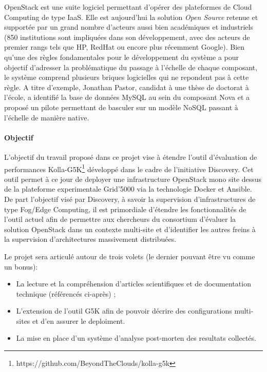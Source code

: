 \documentclass[a4paper,11pt]{article}
\begin{document}
\begin{note}
OpenStack est une suite logiciel permettant d'opérer des plateformes
de Cloud Computing de type IaaS. Elle est aujourd'hui la solution
\emph{Open Source} retenue et supportée par un grand nombre d'acteurs aussi
bien académiques et industriels (850 institutions sont impliquées
dans son développement, avec des acteurs de premier rangs tels que HP,
RedHat ou encore plus récemment Google).  Bien qu'une des règles
fondamentales pour le développement du système a pour objectif
d'adresser la problématique du passage à l'échelle de chaque
composant, le système comprend plusieurs briques logicielles qui ne
repondent pas à cette règle. A titre d'exemple, Jonathan Pastor,
candidat à une thèse de doctorat à l'école, a identifié la base de
données MySQL au sein du composant Nova et a proposé un pilote
permettant de basculer sur un modèle NoSQL passant à l'échelle de
manière native. 



\paragraph*{Objectif\\}
L'objectif du travail proposé dans ce projet vise à étendre l'outil
d'évaluation de performances
Kolla-G5K\footnote{https://github.com/BeyondTheClouds/kolla-g5k}
développé dans le cadre de l'initiative Discovery. Cet outil permet à
ce jour de deployer une infrastructure OpenStack mono site dessus de
la plateforme experimentale Grid'5000 via la technologie Docker et
Ansible.  De part l'objectif visé par Discovery, à savoir la
supervision d'infrastructures de type Fog/Edge Computing, il est
primordiale d'étendre les fonctionnalités de l'outil actuel afin de
permettre aux chercheurs du consortium d'évaluer la solution
OpenStack dans un contexte multi-site et d'identifier les autres
freins à la supervision d'architectures massivement distribuées.

Le projet sera articulé autour de trois volets (le dernier pouvant être vu comme un bonus):
\begin{itemize}
\item La lecture et la compréhension d'articles scientifiques et de documentation technique (référencés ci-après) ; 
\item L'extension de l'outil G5K afin de pouvoir décrire des configurations multi-sites et d'en assurer le deploiment.
\item La mise en place d'un système d'analyse post-morten des resultats collectés. 
\end{itemize}


\end{note}
\end{document}
